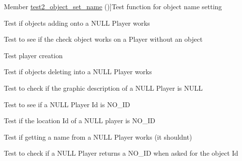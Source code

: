 \begin{DoxyRefList}
Member \hyperlink{object__test_8h_acf42b7e7be91ede243f2aaa56c4c9347}{test2\+\_\+object\+\_\+set\+\_\+name} ()]Test function for object name setting  
\item[\label{test__test000198}%
\hypertarget{test__test000198}{}%
Member \hyperlink{player__test_8h_a864d3935cf61953950b10df0e656306d}{test2\+\_\+player\+\_\+add\+\_\+object} ()]Test if objects adding onto a N\+U\+LL Player works  
\item[\label{test__test000210}%
\hypertarget{test__test000210}{}%
Member \hyperlink{player__test_8h_a18d23e4d24cc31a552f264e270856a49}{test2\+\_\+player\+\_\+check\+\_\+object} ()]Test to see if the check object works on a Player without an object  
\item[\label{test__test000173}%
\hypertarget{test__test000173}{}%
Member \hyperlink{player__test_8h_a4f6eca5f9d8c08d2a7fc70c209ecf854}{test2\+\_\+player\+\_\+create} ()]Test player creation  
\item[\label{test__test000200}%
\hypertarget{test__test000200}{}%
Member \hyperlink{player__test_8h_a32008cea3e74553151b6c8c8ad1b565a}{test2\+\_\+player\+\_\+del\+\_\+object} ()]Test if objects deleting into a N\+U\+LL Player works  
\item[\label{test__test000188}%
\hypertarget{test__test000188}{}%
Member \hyperlink{player__test_8h_a94aa58d9c954a4817ea34ba7d7c17493}{test2\+\_\+player\+\_\+get\+\_\+graphic\+\_\+description} ()]Test to check if the graphic description of a N\+U\+LL Player is N\+U\+LL  
\item[\label{test__test000186}%
\hypertarget{test__test000186}{}%
Member \hyperlink{player__test_8h_a9fa80f0c0e46b45eb9f1685b102a5826}{test2\+\_\+player\+\_\+get\+\_\+id} ()]Test to see if a N\+U\+LL Player Id is N\+O\+\_\+\+ID  
\item[\label{test__test000196}%
\hypertarget{test__test000196}{}%
Member \hyperlink{player__test_8h_a4c5605fac4bd716e1dfb2744db4fa8a1}{test2\+\_\+player\+\_\+get\+\_\+location} ()]Test if the location Id of a N\+U\+LL player is N\+O\+\_\+\+ID  
\item[\label{test__test000184}%
\hypertarget{test__test000184}{}%
Member \hyperlink{player__test_8h_a3aa908fd360b74e7786422260e8e16a0}{test2\+\_\+player\+\_\+get\+\_\+name} ()]Test if getting a name from a N\+U\+LL Player works (it shouldn\textquotesingle{}t)  
\item[\label{test__test000190}%
\hypertarget{test__test000190}{}%
Member \hyperlink{player__test_8h_a83e8fea42cd87151cd67d0643a78134f}{test2\+\_\+player\+\_\+get\+\_\+object} ()]Test to check if a N\+U\+LL Player returns a N\+O\+\_\+\+ID when asked for the object Id  

\end{DoxyRefList}
